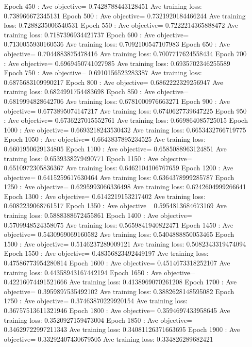 \documentclass{article}
\theoremstyle{plain}
\theoremstyle{definition}
\begin{document}
\begin{enumerate}
Epoch  450 : Ave objective= 0.7428788443128451  Ave training loss:  0.738966672345131
Epoch  500 : Ave objective= 0.7321920184466244  Ave training loss:  0.7288235006540531
Epoch  550 : Ave objective= 0.7222214365888472  Ave training loss:  0.7187396934421737
Epoch  600 : Ave objective= 0.7130055930160536  Ave training loss:  0.7092100547107983
Epoch  650 : Ave objective= 0.7044883875478416  Ave training loss:  0.7007717624558434
Epoch  700 : Ave objective= 0.6969450741027985  Ave training loss:  0.6935702346255589
Epoch  750 : Ave objective= 0.6910156523283387  Ave training loss:  0.6875683109990217
Epoch  800 : Ave objective= 0.6862222329256947  Ave training loss:  0.6824991754483698
Epoch  850 : Ave objective= 0.6819994828642706  Ave training loss:  0.6781000976663271
Epoch  900 : Ave objective= 0.6773895074147217  Ave training loss:  0.6740627739647225
Epoch  950 : Ave objective= 0.6736227015552761  Ave training loss:  0.669864085725015
Epoch  1000 : Ave objective= 0.6693218243530432  Ave training loss:  0.6653432766719775
Epoch  1050 : Ave objective= 0.6643837895234525  Ave training loss:  0.6601950629134805
Epoch  1100 : Ave objective= 0.6585088963124851  Ave training loss:  0.6539338279490771
Epoch  1150 : Ave objective= 0.6510972305836367  Ave training loss:  0.6462104106767659
Epoch  1200 : Ave objective= 0.6415259617630464  Ave training loss:  0.6364378999285787
Epoch  1250 : Ave objective= 0.6295993066336498  Ave training loss:  0.6242604999266641
Epoch  1300 : Ave objective= 0.6142219153217402  Ave training loss:  0.6082239068761517
Epoch  1350 : Ave objective= 0.5954813684673169  Ave training loss:  0.5888388672455861
Epoch  1400 : Ave objective= 0.5709948524358075  Ave training loss:  0.5659841940822471
Epoch  1450 : Ave objective= 0.5430969069160582  Ave training loss:  0.5404888850053465
Epoch  1500 : Ave objective= 0.5146237289009121  Ave training loss:  0.5082343319474094
Epoch  1550 : Ave objective= 0.48356823492449197  Ave training loss:  0.47586773954280814
Epoch  1600 : Ave objective= 0.4514673318252107  Ave training loss:  0.44358943167442194
Epoch  1650 : Ave objective= 0.42216074491521666  Ave training loss:  0.4138969070261208
Epoch  1700 : Ave objective= 0.3959897535492102  Ave training loss:  0.3882628148595082
Epoch  1750 : Ave objective= 0.37463870229920154  Ave training loss:  0.36757513611321946
Epoch  1800 : Ave objective= 0.3594697433958645  Ave training loss:  0.3520927159473004
Epoch  1850 : Ave objective= 0.34629722997211343  Ave training loss:  0.34081126371663695
Epoch  1900 : Ave objective= 0.33292407430679505  Ave training loss:  0.334826289682421

\end{enumerate}
\end{document}
